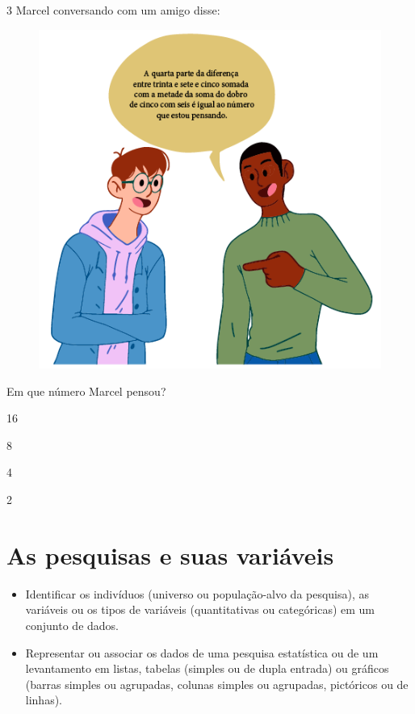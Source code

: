 \pagebreak
\num{3} Marcel conversando com um amigo disse:

\begin{figure}[htpb!]
\centering
\includegraphics[width=.8\textwidth]{../ilustracoes/MAT5/SAEB_5ANO_MAT_figura94.png}
\end{figure}

Em que número Marcel pensou?

\begin{minipage}{.5\textwidth}
\begin{escolha}
\item
  16
\item
  8
\item
  4
\item
  2
\end{escolha}
\end{minipage}

\chapter{As pesquisas e suas variáveis}


\begin{itemize}
\item Identificar os indivíduos (universo ou população-alvo da pesquisa),
as variáveis ou os tipos de variáveis (quantitativas ou categóricas) em 
um conjunto de dados.

\item Representar ou associar os dados de uma pesquisa estatística ou
de um levantamento em listas, tabelas (simples ou de dupla entrada) ou
gráficos (barras simples ou agrupadas, colunas simples ou agrupadas,
pictóricos ou de linhas).
\end{itemize}

